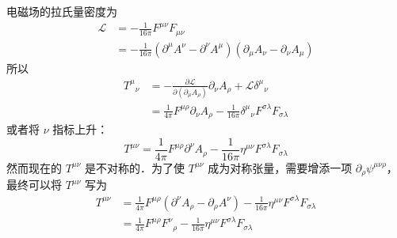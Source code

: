 电磁场的拉氏量密度为
\begin{equation}
\begin{aligned}
\mathcal{L}&=-\frac{1}{16\pi}F^{\mu\nu} F_{\mu\nu}\\
&=-\frac{1}{16\pi}(\partial^\mu A^\nu-\partial^\nu A^\mu)(\partial_\mu A_\nu-\partial_\nu A_\mu)
\end{aligned}
\end{equation}
所以
\begin{equation}
\begin{aligned}
T^\mu{}_\nu&=-\frac{\partial \mathcal{L}}{\partial (\partial_\mu A_\rho)}\partial_\nu A_\rho+\mathcal{L}\delta^\mu{}_\nu\\
&=\frac{1}{4\pi}F^{\mu\rho}\partial_\nu A_\rho-\frac{1}{16\pi}\delta^\mu{}_\nu F^{\sigma\lambda}F_{\sigma\lambda}
\end{aligned}
\end{equation}
或者将 $\nu$ 指标上升：
\begin{equation}
T^{\mu\nu}=\frac{1}{4\pi}F^{\mu\rho}\partial^\nu A_\rho - \frac{1}{16\pi} \eta^{\mu\nu}F^{\sigma\lambda}F_{\sigma\lambda}
\end{equation}
然而现在的 $T^{\mu\nu}$ 是不对称的．为了使 $T^{\mu\nu}$ 成为对称张量，需要增添一项 $\partial_\rho \psi^{\mu\nu\rho}$，最终可以将 $T^{\mu\nu}$ 写为
\begin{equation}
\begin{aligned}
T^{\mu\nu}&=\frac{1}{4\pi}F^{\mu\rho}(\partial^\nu A_\rho-\partial_\rho A^\nu) - \frac{1}{16\pi} \eta^{\mu\nu}F^{\sigma\lambda}F_{\sigma\lambda}\\
&=\frac{1}{4\pi}F^{\mu\rho}F^\nu{}_\rho - \frac{1}{16\pi} \eta^{\mu\nu}F^{\sigma\lambda}F_{\sigma\lambda}
\end{aligned}
\end{equation}

